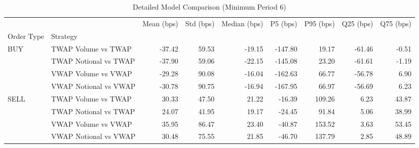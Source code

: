 \begin{table}
\caption{Detailed Model Comparison (Minimum Period 6)}
\label{tab:detailed_min_period_6}
\begin{tabular}{l|l|rrrrrrr}
\toprule
 &  & Mean (bps) & Std (bps) & Median (bps) & P5 (bps) & P95 (bps) & Q25 (bps) & Q75 (bps) \\
Order Type & Strategy &  &  &  &  &  &  &  \\
\midrule
\multirow[t]{4}{*}{BUY} & TWAP Volume vs TWAP & -37.42 & 59.53 & -19.15 & -147.80 & 19.17 & -61.46 & -0.51 \\
 & TWAP Notional vs TWAP & -37.90 & 59.06 & -22.15 & -145.08 & 23.20 & -61.61 & -1.19 \\
 & VWAP Volume vs VWAP & -29.28 & 90.08 & -16.04 & -162.63 & 66.77 & -56.78 & 6.90 \\
 & VWAP Notional vs VWAP & -30.78 & 90.75 & -16.94 & -167.95 & 66.97 & -56.69 & 6.23 \\
\cline{1-9}
\multirow[t]{4}{*}{SELL} & TWAP Volume vs TWAP & 30.33 & 47.50 & 21.22 & -16.39 & 109.26 & 6.23 & 43.87 \\
 & TWAP Notional vs TWAP & 24.07 & 41.95 & 19.17 & -24.45 & 91.84 & 5.06 & 38.99 \\
 & VWAP Volume vs VWAP & 35.95 & 86.47 & 23.40 & -40.87 & 153.52 & 3.63 & 53.45 \\
 & VWAP Notional vs VWAP & 30.48 & 75.55 & 21.85 & -46.70 & 137.79 & 2.85 & 48.89 \\
\cline{1-9}
\bottomrule
\end{tabular}
\end{table}
